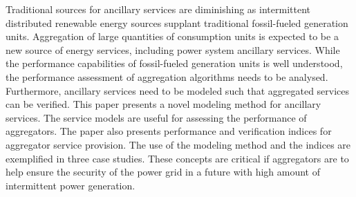 
Traditional sources for ancillary services are diminishing as intermittent distributed renewable energy sources supplant traditional fossil-fueled generation units. Aggregation of large quantities of consumption units is expected to be a new source of energy services, including power system ancillary services.
While the performance capabilities of fossil-fueled generation units is well understood, the performance assessment of aggregation algorithms needs to be analysed. Furthermore, ancillary services need to be modeled such that aggregated services can be verified.
This paper presents a novel modeling method for ancillary services. The service models are useful for assessing the performance of aggregators. The paper also presents performance and verification indices for aggregator service provision.
The use of the modeling method and the indices are exemplified in three case studies.
These concepts are critical if aggregators are to help ensure the security of the power grid in a future with high amount of intermittent power generation. 
